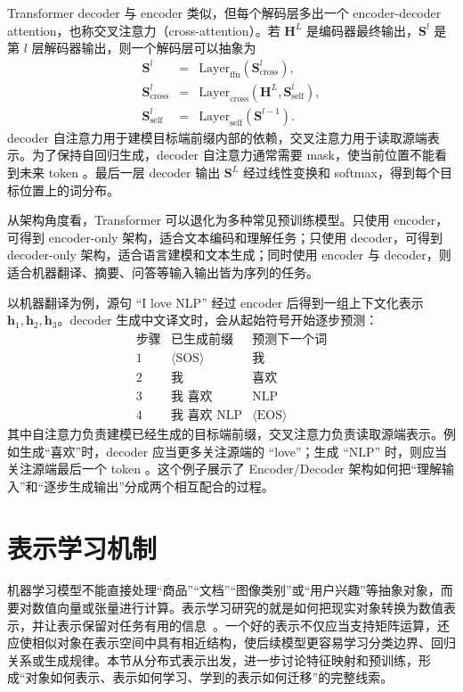 Transformer decoder 与 encoder 类似，但每个解码层多出一个 encoder-decoder attention，也称交叉注意力（cross-attention）。若 $\mathbf{H}^{L}$ 是编码器最终输出，$\mathbf{S}^{l}$ 是第 $l$ 层解码器输出，则一个解码层可以抽象为
\begin{eqnarray}
\mathbf{S}^{l}
& = &
\mathrm{Layer}_{\mathrm{ffn}}(\mathbf{S}_{\mathrm{cross}}^{l}),\\
\mathbf{S}_{\mathrm{cross}}^{l}
& = &
\mathrm{Layer}_{\mathrm{cross}}(\mathbf{H}^{L},\mathbf{S}_{\mathrm{self}}^{l}),\\
\mathbf{S}_{\mathrm{self}}^{l}
& = &
\mathrm{Layer}_{\mathrm{self}}(\mathbf{S}^{l-1}).
\end{eqnarray}
decoder 自注意力用于建模目标端前缀内部的依赖，交叉注意力用于读取源端表示。为了保持自回归生成，decoder 自注意力通常需要 mask，使当前位置不能看到未来 token 。最后一层 decoder 输出 $\mathbf{S}^{L}$ 经过线性变换和 softmax，得到每个目标位置上的词分布。

从架构角度看，Transformer 可以退化为多种常见预训练模型。只使用 encoder，可得到 encoder-only 架构，适合文本编码和理解任务；只使用 decoder，可得到 decoder-only 架构，适合语言建模和文本生成；同时使用 encoder 与 decoder，则适合机器翻译、摘要、问答等输入输出皆为序列的任务。

以机器翻译为例，源句 ``I love NLP'' 经过 encoder 后得到一组上下文化表示 $\mathbf{h}_1,\mathbf{h}_2,\mathbf{h}_3$。decoder 生成中文译文时，会从起始符号开始逐步预测：
\[
\begin{array}{c|c|c}
\text{步骤} & \text{已生成前缀} & \text{预测下一个词}\\ \hline
1 & \langle \mathrm{SOS}\rangle & \text{我}\\
2 & \text{我} & \text{喜欢}\\
3 & \text{我 喜欢} & \text{NLP}\\
4 & \text{我 喜欢 NLP} & \langle \mathrm{EOS}\rangle
\end{array}
\]
其中自注意力负责建模已经生成的目标端前缀，交叉注意力负责读取源端表示。例如生成“喜欢”时，decoder 应当更多关注源端的 ``love''；生成 ``NLP'' 时，则应当关注源端最后一个 token 。这个例子展示了 Encoder/Decoder 架构如何把“理解输入”和“逐步生成输出”分成两个相互配合的过程。

\section{表示学习机制}

机器学习模型不能直接处理“商品”“文档”“图像类别”或“用户兴趣”等抽象对象，而要对数值向量或张量进行计算。表示学习研究的就是如何把现实对象转换为数值表示，并让表示保留对任务有用的信息~\cite{BengioEtAl2013Representation}。一个好的表示不仅应当支持矩阵运算，还应使相似对象在表示空间中具有相近结构，使后续模型更容易学习分类边界、回归关系或生成规律。本节从分布式表示出发，进一步讨论特征映射和预训练，形成“对象如何表示、表示如何学习、学到的表示如何迁移”的完整线索。

